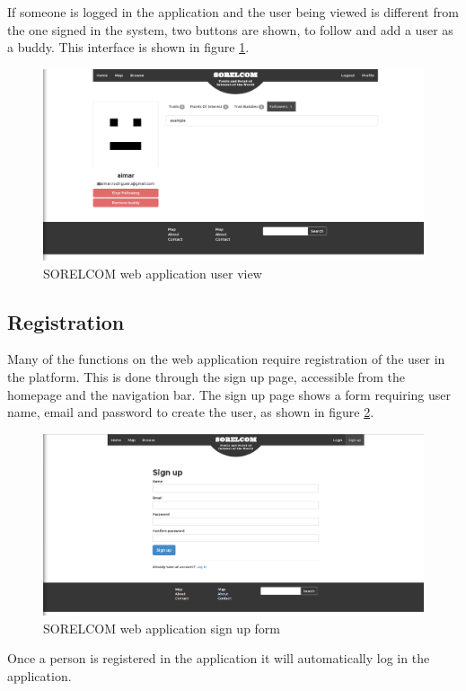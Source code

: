 If someone is logged in the application and the user being viewed is different from the one signed in the system, two buttons are shown, to follow and add a user as a buddy. This interface is shown in figure \ref{fig:user-view}.

\begin{figure}[ht]
  \centering
  \includegraphics[width=.75\textwidth]{fig/user}
  \caption{SORELCOM web application user view}
  \label{fig:user-view}
\end{figure}

\subsection{Registration}

Many of the functions on the web application require registration of the user in the platform. This is done through the sign up page, accessible from the homepage and the navigation bar. The sign up page shows a form requiring user name, email and password to create the user, as shown in figure \ref{fig:sign-up}.

\begin{figure}[ht]
  \centering
  \includegraphics[width=.75\textwidth]{fig/sign-up}
  \caption{SORELCOM web application sign up form}
  \label{fig:sign-up}
\end{figure}

Once a person is registered in the application it will automatically log in the application. 

